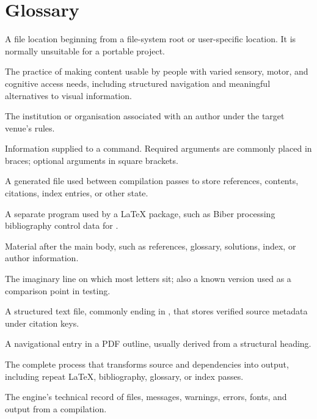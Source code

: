 \chapter*{Glossary}

\begin{description}[style=nextline,leftmargin=1.6em,itemsep=0.75em]
  \item[Absolute path] A file location beginning from a file-system root or
        user-specific location. It is normally unsuitable for a portable
        project.
  \item[Accessibility] The practice of making content usable by people with
        varied sensory, motor, and cognitive access needs, including structured
        navigation and meaningful alternatives to visual information.
  \item[Affiliation] The institution or organisation associated with an author
        under the target venue's rules.
  \item[Argument] Information supplied to a command. Required arguments are
        commonly placed in braces; optional arguments in square brackets.
  \item[Auxiliary file] A generated file used between compilation passes to
        store references, contents, citations, index entries, or other state.
  \item[Backend] A separate program used by a \LaTeX{} package, such as Biber
        processing bibliography control data for .
  \item[Back matter] Material after the main body, such as references, glossary,
        solutions, index, or author information.
  \item[Baseline] The imaginary line on which most letters sit; also a known
        version used as a comparison point in testing.
  \item[Bibliography database] A structured text file, commonly ending in
        , that stores verified source metadata under citation keys.
  \item[Bookmark] A navigational entry in a PDF outline, usually derived from a
        structural heading.
  \item[Build] The complete process that transforms source and dependencies into
        output, including repeat \LaTeX{}, bibliography, glossary, or index passes.
  \item[Build log] The engine's technical record of files, messages, warnings,
        errors, fonts, and output from a compilation.

\end{description}
